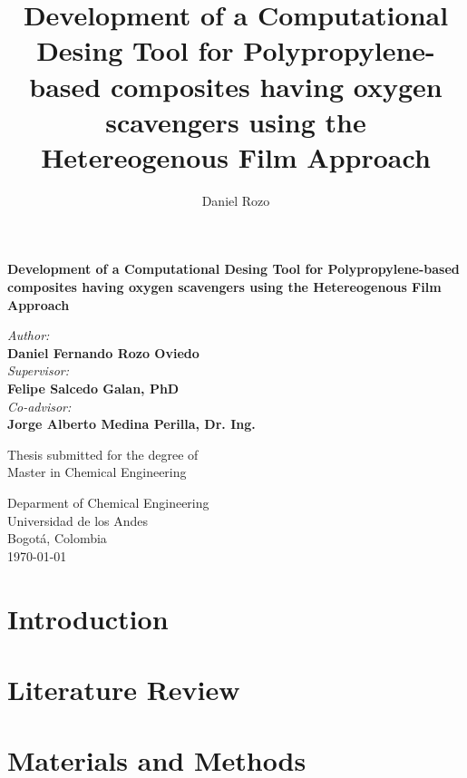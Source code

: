 \documentclass[twoside,11pt]{report}
\title{Development of a Computational Desing Tool for Polypropylene-based composites having oxygen scavengers using the Hetereogenous Film Approach}
\author{Daniel Rozo}
\date{\Today}
\begin{document}
\begin{titlepage}
\begin{center}
\BgThispage
        \huge
        \textbf{Development of a Computational Desing Tool for Polypropylene-based composites having oxygen scavengers using the Hetereogenous Film Approach}
        
        \vspace{1cm}
        \LARGE

        \vspace{1cm}
        \textit{Author:}\\
        \textbf{Daniel Fernando Rozo Oviedo}\\
        \vspace{1.5cm}
        \textit{Supervisor:}\\
        \textbf{Felipe Salcedo Galan, PhD}\\
        \textit{Co-advisor:}\\
        \textbf{Jorge Alberto Medina Perilla, Dr. Ing.}
        \vfill
 
        Thesis submitted for the degree of\\ Master in Chemical Engineering
        
 
        \vspace{0.5cm}
 
        
 
        \Large
        Deparment of Chemical Engineering\\
        Universidad de los Andes\\
        Bogotá, Colombia\\
        \today
 
    \end{center}
\afterpage{\null\newpage}
\end{titlepage}
\tableofcontents
\vspace{\fill}

\chapter{Introduction}
\pagestyle{fancy}


\chapter{Literature Review}

\chapter{Materials and Methods}

\end{document}
